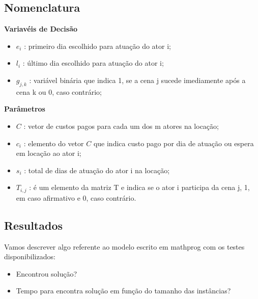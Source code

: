 \subsection{Nomenclatura}
\textbf{Variavéis de Decisão}
\begin{itemize}
  \item $e_i$ : primeiro dia escolhido para atuação do ator i;
  \item $l_i$ : último dia escolhido para atuação do ator i;
  \item $g_{j,k}$ : variável binária que indica 1, se a cena j sucede imediamente após a cena k ou 0, caso contrário;
\end{itemize}
\newpage
\textbf{Parâmetros}
\begin{itemize}
  \item $C$ : vetor de custos pagos para cada um dos m atores na locação;
  \item $c_i$ : elemento do vetor $C$ que indica custo pago por dia de atuação ou espera em locação ao ator i;
  \item $s_i$ : total de dias de atuação do ator i na locação;
  \item $T_{i,j}$ : é um elemento da matriz T e indica se o ator i participa da cena j, 1, em caso afirmativo e 0, caso contrário.
  
\end{itemize}
\subsection{Resultados}
Vamos descrever algo referente ao modelo escrito em mathprog com os testes disponibilizados:\\
\begin{itemize}
\item Encontrou solução?
\item Tempo para encontra solução em função do tamanho das instâncias?
\end{itemize}